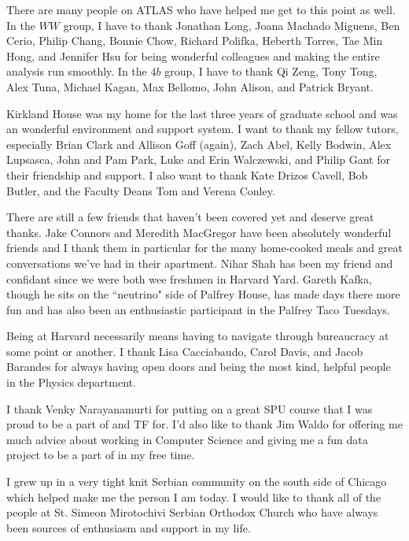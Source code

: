 \begin{doublespace}
There are many people on ATLAS who have helped me get to this point as well. In the $WW$ group, I have to thank Jonathan Long, Joana Machado Miguens, Ben Cerio, Philip Chang, Bonnie Chow, Richard Polifka, Heberth Torres, Tae Min Hong, and Jennifer Hsu for being wonderful colleagues and making the entire analysis run smoothly. In the $4b$ group, I have to thank Qi Zeng, Tony Tong, Alex Tuna, Michael Kagan, Max Bellomo, John Alison, and Patrick Bryant. 

Kirkland House was my home for the last three years of graduate school and was an wonderful environment and support system. I want to thank my fellow tutors, especially Brian Clark and Allison Goff (again), Zach Abel, Kelly Bodwin, Alex Lupsasca, John and Pam Park, Luke and Erin Walczewski, and Philip Gant for their friendship and support. I also want to thank Kate Drizos Cavell, Bob Butler, and the Faculty Deans Tom and Verena Conley.

There are still a few friends that haven't been covered yet and deserve great thanks. Jake Connors and Meredith MacGregor have been absolutely wonderful friends and I thank them in particular for the many home-cooked meals and great conversations we've had in their apartment. Nihar Shah has been my friend and confidant since we were both wee freshmen in Harvard Yard. Gareth Kafka, though he sits on the ``neutrino" side of Palfrey House, has made days there more fun and has also been an enthusiastic participant in the Palfrey Taco Tuesdays.  

Being at Harvard necessarily means having to navigate through bureaucracy at some point or another. I thank Lisa Cacciabaudo, Carol Davis, and Jacob Barandes for always having open doors and being the most kind, helpful people in the Physics department. 

I thank Venky Narayanamurti for putting on a great SPU course that I was proud to be a part of and TF for. I'd also like to thank Jim Waldo for offering me much advice about working in Computer Science and giving me a fun data project to be a part of in my free time. 

I grew up in a very tight knit Serbian community on the south side of Chicago which helped make me the person I am today. I would like to thank all of the people at St. Simeon Mirotochivi Serbian Orthodox Church who have always been sources of enthusiasm and support in my life. 


\end{doublespace}
